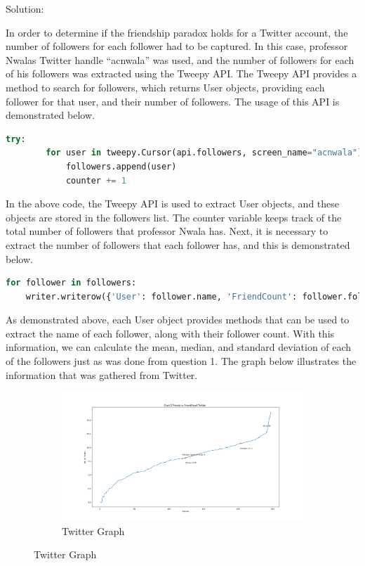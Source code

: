 \documentclass[11pt]{scrartcl} %
\begin{document}
\bigskip\bigskip
\LARGE Solution: \newline\newline\small

\tabto{2.0cm} In order to determine if the friendship paradox holds for a Twitter account, the number of followers for each follower had to be captured. In this case, professor Nwalas Twitter handle ``acnwala'' was used, and the number of followers for each of his followers was extracted using the Tweepy API. The Tweepy API provides a method to search for followers, which returns User objects, providing each follower for that user, and their number of followers. The usage of this API is demonstrated below.

\begin{lstlisting}[language = Python, caption=Getting User Objects]
try:
        for user in tweepy.Cursor(api.followers, screen_name="acnwala").items():
            followers.append(user)
            counter += 1
\end{lstlisting} \bigskip 

\tabto{2.0cm} In the above code, the Tweepy API is used to extract User objects, and these objects are stored in the followers list. The counter variable keeps track of the total number of followers that professor Nwala has. Next, it is necessary to extract the number of followers that each follower has, and this is demonstrated below.


\begin{lstlisting}[language = Python, caption=Extracting Follower Count]
  for follower in followers:
    writer.writerow({'User': follower.name, 'FriendCount': follower.followers_count})
\end{lstlisting}

\tabto{2.0cm} As demonstrated above, each User object provides methods that can be used to extract the name of each follower, along with their follower count. With this information, we can calculate the mean, median, and standard deviation of each of the followers just as was done from question 1. The graph below illustrates the information that was gathered from Twitter.

\begin{figure}[h!]
\begin{subfigure}[b]{1.0\linewidth }
    \includegraphics[width=\linewidth]{../Figures/TwitterGraph.png}
    \caption{Twitter Graph}
\end{subfigure}
\end{figure}
\end{document}
